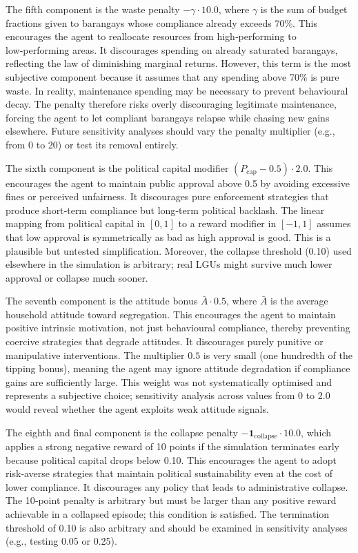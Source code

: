 The fifth component is the waste penalty \(-\gamma \cdot 10.0\), where \(\gamma\) is the sum of budget fractions given to barangays whose compliance already exceeds 70\%. This encourages the agent to reallocate resources from high‑performing to low‑performing areas. It discourages spending on already saturated barangays, reflecting the law of diminishing marginal returns. However, this term is the most subjective component because it assumes that any spending above 70\% is pure waste. In reality, maintenance spending may be necessary to prevent behavioural decay. The penalty therefore risks overly discouraging legitimate maintenance, forcing the agent to let compliant barangays relapse while chasing new gains elsewhere. Future sensitivity analyses should vary the penalty multiplier (e.g., from 0 to 20) or test its removal entirely.

The sixth component is the political capital modifier \((P_{\text{cap}} - 0.5) \cdot 2.0\). This encourages the agent to maintain public approval above 0.5 by avoiding excessive fines or perceived unfairness. It discourages pure enforcement strategies that produce short‑term compliance but long‑term political backlash. The linear mapping from political capital in \([0,1]\) to a reward modifier in \([-1,1]\) assumes that low approval is symmetrically as bad as high approval is good. This is a plausible but untested simplification. Moreover, the collapse threshold (0.10) used elsewhere in the simulation is arbitrary; real LGUs might survive much lower approval or collapse much sooner.

The seventh component is the attitude bonus \(\bar{A} \cdot 0.5\), where \(\bar{A}\) is the average household attitude toward segregation. This encourages the agent to maintain positive intrinsic motivation, not just behavioural compliance, thereby preventing coercive strategies that degrade attitudes. It discourages purely punitive or manipulative interventions. The multiplier \(0.5\) is very small (one hundredth of the tipping bonus), meaning the agent may ignore attitude degradation if compliance gains are sufficiently large. This weight was not systematically optimised and represents a subjective choice; sensitivity analysis across values from 0 to 2.0 would reveal whether the agent exploits weak attitude signals.

The eighth and final component is the collapse penalty \(-\mathbf{1}_{\text{collapse}} \cdot 10.0\), which applies a strong negative reward of 10 points if the simulation terminates early because political capital drops below 0.10. This encourages the agent to adopt risk‑averse strategies that maintain political sustainability even at the cost of lower compliance. It discourages any policy that leads to administrative collapse. The 10‑point penalty is arbitrary but must be larger than any positive reward achievable in a collapsed episode; this condition is satisfied. The termination threshold of 0.10 is also arbitrary and should be examined in sensitivity analyses (e.g., testing 0.05 or 0.25).

